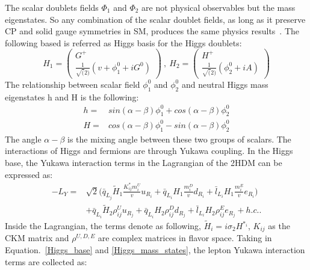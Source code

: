The scalar doublets fields $\Phi_{1}$ and $\Phi_{2}$ are not physical observables but the mass eigenstates. So any combination of the scalar doublet fields, as long as it preserve CP and solid gauge symmetries in SM, produces the same physics results~\cite{BRANCO20121}. The following based is referred as Higgs basis for the Higgs doublets:
\begin{equation}\label{Higgs_base}
H_{1}=
\begin{pmatrix}
G^{+}    \\
\frac{1}{\sqrt(2)}(v+\phi^{0}_{1}+iG^{0})
\end{pmatrix}~,~
H_{2}=
\begin{pmatrix}
H^{+}    \\
\frac{1}{\sqrt(2)}(\phi^{0}_{2}+iA)
\end{pmatrix}
\end{equation}
The relationship between scalar field $\phi_{1}^{0}$ and $\phi_{2}^{0}$ and neutral Higgs mass eigenstates h and H is the following:
\begin{equation}\label{Higgs_mass_states}
\begin{aligned}
h=&sin(\alpha-\beta)\phi_{1}^{0}+cos(\alpha-\beta)\phi_{2}^{0}\\
H=&cos(\alpha-\beta)\phi_{1}^{0}-sin(\alpha-\beta)\phi_{2}^{0}
\end{aligned}
\end{equation}
The angle $\alpha-\beta$ is the mixing angle between these two groups of scalars. The interactions of Higgs and fermions are through Yukawa coupling. In the Higgs base, the Yukawa interaction terms in the Lagrangian of the 2HDM can be expressed as:
\begin{equation}
\begin{aligned}
-L_{Y}=&\sqrt{2}\big(\bar{q}_{L_{j}}\tilde{H}_{1}\frac{K^{\ast}_{ij}m^{U}_{i}}{v}u_{R_{i}}+\bar{q}_{L_{i}}H_{1}\frac{m^{D}_{i}}{v}d_{R_{i}}+\bar{l}_{L_{i}}H_{1}\frac{m^{E}_{i}}{v}e_{R_{i}}\big) \\
            &+\bar{q}_{L_{i}}\tilde{H}_{2}\rho^{U}_{ij}u_{R_{j}}+\bar{q}_{L_{i}}H_{2}\rho^{D}_{ij}d_{R_{j}}+\bar{l}_{L_{i}}H_{2}\rho^{E}_{ij}e_{R_{j}}+h.c..
\end{aligned}
\end{equation}
Inside the Lagrangian, the terms denote as following, $\tilde{H}_i=i\sigma_{2}H^{\ast_{i}}$,  $K_{ij}$ as the CKM matrix and $\rho^{U,D,E}$ are complex matrices in flavor space. Taking in Equation.~\ref{Higgs_base} and \ref{Higgs_mass_states}, the lepton Yukawa interaction terms are collected as:
